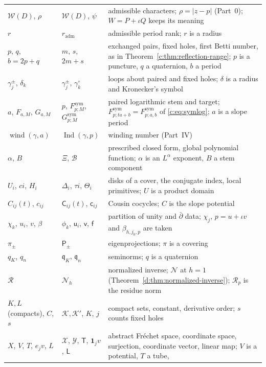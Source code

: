 \documentclass[11pt,a4paper]{article}
\numberwithin{equation}{section}
\theoremstyle{definition}
\theoremstyle{remark}
\theoremstyle{plain}
\DeclareMathOperator{\Ind}{Ind}
\newcommand{\Rp}{\mathcal R_{p}}      %
\newcommand{\abs}[1]{\lvert #1\rvert}
\newcommand{\Herm}{\Theta}                        %
\begin{document}
{\begin{longtable}{@{}p{}p{}p{}@{}}
$\mathscr W(D)$, $\rho$ & $\mathscr W(D)$, $\psi$ & admissible characters;
 $\rho=\abs{z-p}$ (Part~0); $W=P+\iota Q$ keeps its meaning\\
$r$ & $r_{\mathrm{adm}}$ & admissible period rank; $r$ is a radius\\
$p$, $q$, $b=2p+q$ & $m$, $s$, $2m+s$ & exchanged pairs, fixed holes, first
 Betti number, as in Theorem~\ref{c:thm:reflection-range}; $p$ is a puncture,
 $q$ a quaternion, $b$ a period\\
$\gamma^\pm_j$, $\delta_k$ & $\gamma^\pm_j$, $\gamma^\circ_k$ & loops about
 paired and fixed holes; $\delta$ is a radius and Kronecker's symbol\\
$a$, $F_{a,M}$, $G_{a,M}$ & $p$, $F^{\mathrm{sym}}_{p;M}$,
 $G^{\mathrm{sym}}_{p;M}$ & paired logarithmic stem and target;
 $F^{\mathrm{sym}}_{p;ta+b}=F^{\mathrm{sym}}_{p;a,b}$ of \eqref{c:eq:symlog};
 $a$ is a slope period\\
$\operatorname{wind}(\gamma,a)$ & $\Ind(\gamma,p)$ & winding number (Part~IV)\\
$\alpha$, $B$ & $\Xi$, $\mathscr B$ & prescribed closed form, global
 polynomial function; $\alpha$ is an $L^\alpha$ exponent, $B$ a stem
 component\\
$U_i$, $ci$, $H_i$ & $\Delta_i$, $\tau i$, $\Herm_i$ & disks of a cover, the
 conjugate index, local primitives; $U$ is a product domain\\
$C_{ij}(t)$, $c_{ij}$ & $\mathsf C_{ij}(t)$, $\mathsf c_{ij}$ & Cousin
 cocycles; $C$ is the slope potential\\
$\chi_k$, $u_i$, $v$, $\beta$ & $\phi_k$, $\mathsf u_i$, $\mathsf v$,
 $\mathsf f$ & partition of unity and $\bar\partial$ data; $\chi_j$,
 $p=u+\iota v$ and $\beta_{h,j_0,p}$ are taken\\
$\pi_\pm$ & $\mathsf P_\pm$ & eigenprojections; $\pi$ is a covering\\
$q_K$, $q_n$ & $\mathfrak q_K$, $\mathfrak q_n$ & seminorms; $q$ is a
 quaternion\\
$\mathcal R$ & $\mathcal N_h$ & normalized inverse; $\mathcal N$ at $h=1$
 (Theorem~\ref{d:thm:normalized-inverse}); $\Rp$ is the residue norm\\
$K,L$ (compacts), $C$, $s$ & $\mathcal K,\mathcal K'$, $K$, $j$ & compact
 sets, constant, derivative order; $s$ counts fixed holes\\
$X$, $V$, $T$, $e_jv$, $L$ & $\mathcal X$, $\mathcal Y$, $\mathsf T$,
 $\mathbf 1_jv$, $\mathsf L$ & abstract Fr\'echet space, coordinate space,
 surjection, coordinate vector, linear map; $V$ is a potential, $T$ a tube,

\end{longtable}}
\end{document}
